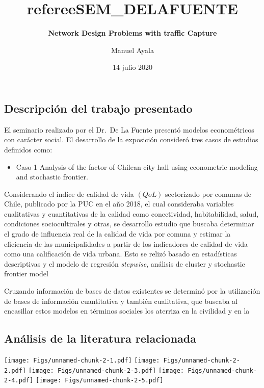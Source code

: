 \documentclass[
  american,
]{article}
\title{refereeSEM\_DELAFUENTE}
\subtitle{\textbf{Network Design Problems with traffic Capture}}
\author{Manuel Ayala}
\date{14 julio 2020}
\providecommand{\tightlist}{%
  \setlength{\itemsep}{0pt}\setlength{\parskip}{0pt}}
\begin{document}
\maketitle

\hypertarget{descripciuxf3n-del-trabajo-presentado}{%
\subsection{Descripción del trabajo
presentado}\label{descripciuxf3n-del-trabajo-presentado}}

El seminario realizado por el Dr.~De La Fuente presentó modelos
econométricos con carácter social. El desarrollo de la exposición
consideró tres casos de estudios definidos como:

\begin{itemize}
\tightlist
\item
  Caso 1 Analysis of the factor of Chilean city hall using econometric
  modeling and stochastic frontier.
\end{itemize}

Considerando el índice de calidad de vida \((QoL)\) sectorizado por
comunas de Chile, publicado por la PUC en el año 2018, el cual
consideraba variables cualitativas y cuantitativas de la calidad como
conectividad, habitabilidad, salud, condiciones sociocultirales y otras,
se desarrollo estudio que buscaba determinar el grado de influencia real
de la calidad de vida por comuna y estimar la eficiencia de las
municipalidades a partir de los indicadores de calidad de vida como una
calificación de vida urbana. Esto se relizó basado en estadísticas
descriptivas y el modelo de regresión \emph{stepwise}, análisis de
cluster y stochastic frontier model

Cruzando información de bases de datos existentes se determinó por la
utilización de bases de información cuantitativa y también cualitativa,
que buscaba al encasillar estos modelos en términos sociales los
aterriza en la civilidad y en la

\hypertarget{anuxe1lisis-de-la-literatura-relacionada}{%
\subsection{Análisis de la literatura
relacionada}\label{anuxe1lisis-de-la-literatura-relacionada}}

\texttt{[image: Figs/unnamed-chunk-2-1.pdf]}
\texttt{[image: Figs/unnamed-chunk-2-2.pdf]}
\texttt{[image: Figs/unnamed-chunk-2-3.pdf]}
\texttt{[image: Figs/unnamed-chunk-2-4.pdf]}
\texttt{[image: Figs/unnamed-chunk-2-5.pdf]}
\end{document}
